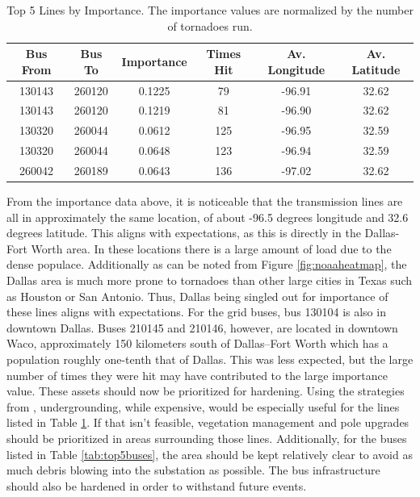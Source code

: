 \documentclass[12pt]{article}
\begin{document}
\begin{table}[ht]
    \centering
    \begin{tabular}{cccccc}
        \toprule
        Bus From & Bus To & Importance & Times Hit & Av. Longitude & Av. Latitude \\
        \midrule
        130143 & 260120 & 0.1225 & 79 & -96.91 & 32.62 \\
        130143 & 260120 & 0.1219 & 81 & -96.90 & 32.62 \\
        130320 & 260044 & 0.0612 & 125 & -96.95 & 32.59 \\
        130320 & 260044 & 0.0648 & 123 & -96.94 & 32.59 \\
        260042 & 260189 & 0.0643 & 136 & -97.02 & 32.62 \\
        \bottomrule
    \end{tabular}
    \caption[Top 5 Lines by Importance]{Top 5 Lines by Importance. The importance values are normalized by the number of tornadoes run.}
    \label{tab:top5lines}
\end{table}

From the importance data above, it is noticeable that the transmission lines are all in approximately the same location, of about -96.5 degrees longitude and 32.6 degrees latitude. This aligns with expectations, as this is directly in the Dallas-Fort Worth area. In these locations there is a large amount of load due to the dense populace. Additionally as can be noted from Figure \ref{fig:noaaheatmap}, the Dallas area is much more prone to tornadoes than other large cities in Texas such as Houston or San Antonio. Thus, Dallas being singled out for importance of these lines aligns with expectations. For the grid buses, bus 130104 is also in downtown Dallas. Buses 210145 and 210146, however, are located in downtown Waco, approximately 150 kilometers south of Dallas–Fort Worth which has a population roughly one-tenth that of Dallas. This was less expected, but the large number of times they were hit may have contributed to the large importance value. These assets should now be prioritized for hardening. Using the strategies from \cite{hughes2024assessing}, undergrounding, while expensive, would be especially useful for the lines listed in Table \ref{tab:top5lines}. If that isn't feasible, vegetation management and pole upgrades should be prioritized in areas surrounding those lines. Additionally, for the buses listed in Table \ref{tab:top5buses}, the area should be kept relatively clear to avoid as much debris blowing into the substation as possible. The bus infrastructure should also be hardened in order to withstand future events. 
\end{document}
